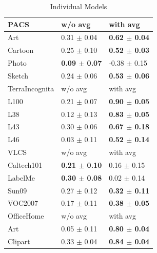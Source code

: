 \begin{table}[t]
\caption{Spearman correlation (closer to 1 is better) between within-run in-domain validation accuracy and out-domain test accuracy on the multiple datasets in the DomainBed benchmark for individual models (left) and ensembles (right). In most cases, using model averaging results in a significantly better rank correlation, which makes model selection more reliable.}

\begin{minipage}{.5\linewidth}
      \caption{Individual Models}
      \centering
        \begin{tabular}{lll}
        \hhline{===}
        PACS    & w/o avg & with avg   \\ \hline
        Art     & 0.31 $\pm$ 0.04   & \textbf{0.62 $\pm$ 0.04}   \\
        Cartoon & 0.25 $\pm$ 0.10   & \textbf{0.52 $\pm$ 0.03}  \\
        Photo   & \textbf{0.09 $\pm$ 0.07}   & -0.38 $\pm$ 0.15 \\
        Sketch  & 0.24 $\pm$ 0.06   & \textbf{0.53 $\pm$ 0.06}  \\ \hhline{===}
        TerraIncognita    & w/o avg & with avg   \\ \hline
        L100     & 0.21 $\pm$ 0.07   & \textbf{0.90 $\pm$ 0.05}   \\
        L38 & 0.12 $\pm$ 0.13   & \textbf{0.83 $\pm$ 0.05}  \\
        L43   & 0.30 $\pm$ 0.06   & \textbf{0.67 $\pm$ 0.18} \\
        L46  & 0.03 $\pm$ 0.11   & \textbf{0.52 $\pm$ 0.14}  \\ 
        \hhline{===}
        VLCS    & w/o avg & with avg   \\ \hline
        Caltech101     & \textbf{0.21 $\pm$ 0.10}   & 0.16 $\pm$ 0.15   \\
        LabelMe & \textbf{0.30 $\pm$ 0.08}   & 0.02 $\pm$ 0.14  \\
        Sun09   & 0.27 $\pm$ 0.12   & \textbf{0.32 $\pm$ 0.11} \\
        VOC2007  & 0.17 $\pm$ 0.11   & \textbf{0.38 $\pm$ 0.05}  \\ \hhline{===}
        OfficeHome    & w/o avg & with avg   \\ \hline
        Art     & 0.05 $\pm$ 0.11   & \textbf{0.80 $\pm$ 0.04}   \\
        Clipart & 0.33 $\pm$ 0.04   & \textbf{0.84 $\pm$ 0.04} \\

\end{tabular}
\end{minipage}
\end{table}

